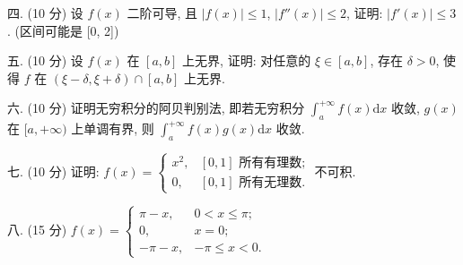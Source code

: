 \documentclass{examcollection}
\begin{document}
{\begin{minipage}{\textwidth}
四. (10 分) 设 $f(x)$ 二阶可导, 且 $|f(x)| \leq 1$, $|f''(x)| \leq 2$, 证明: $|f'(x)| \leq 3$. (区间可能是 [0, 2])\par
五. (10 分) 设 $f(x)$ 在 $[a, b]$ 上无界, 证明: 对任意的 $\xi \in [a, b]$, 存在 $\delta > 0$, 使得 $f$ 在 $(\xi - \delta, \xi + \delta) \cap [a, b]$ 上无界.\par
六. (10 分) 证明无穷积分的阿贝判别法, 即若无穷积分 $\int_{a}^{+\infty} f(x) \mathrm{d}x$ 收敛, $g(x)$ 在 $[a, +\infty)$ 上单调有界, 则 $\int_{a}^{+\infty} f(x) g(x) \mathrm{d}x$ 收敛.\par
七. (10 分) 证明: $f(x) = \begin{cases} x^2, & [0,1] \text{ 所有有理数;} \\ 0, & [0,1] \text{ 所有无理数.} \end{cases}$ 不可积.\par
八. (15 分) $f(x) = \begin{cases} \pi - x, & 0 < x \leq \pi; \\ 0, & x = 0; \\ -\pi - x, & -\pi \leq x < 0. \end{cases}$\par
\end{minipage}}
\ifdim\dimexpr\ht\proofbox+\dp\proofbox\relax>\textheight
\noindent\resizebox{!}{\textheight}{\usebox{\proofbox}}\else\noindent\usebox{\proofbox}\fi\clearpage
\end{document}
